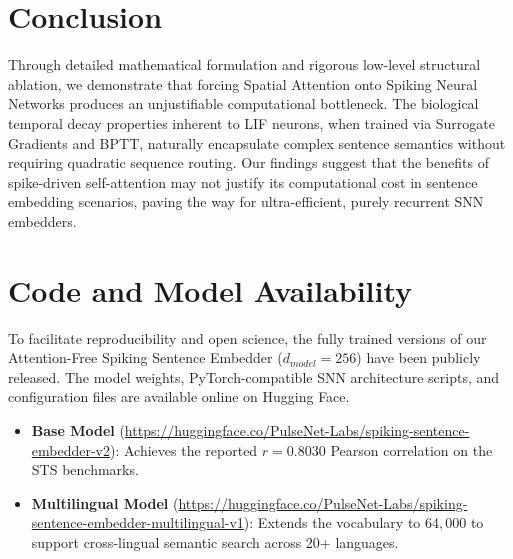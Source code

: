 \documentclass[final]{clv2025}
\begin{document}
\section{Conclusion}
Through detailed mathematical formulation and rigorous low-level structural ablation, we demonstrate that forcing Spatial Attention onto Spiking Neural Networks produces an unjustifiable computational bottleneck. The biological temporal decay properties inherent to LIF neurons, when trained via Surrogate Gradients and BPTT, naturally encapsulate complex sentence semantics without requiring quadratic sequence routing. Our findings suggest that the benefits of spike-driven self-attention may not justify its computational cost in sentence embedding scenarios, paving the way for ultra-efficient, purely recurrent SNN embedders.


\section{Code and Model Availability}
To facilitate reproducibility and open science, the fully trained versions of our Attention-Free Spiking Sentence Embedder ($d_{model} = 256$) have been publicly released. The model weights, PyTorch-compatible SNN architecture scripts, and configuration files are available online on Hugging Face.
\begin{itemize}
    \item \textbf{Base Model} (\url{https://huggingface.co/PulseNet-Labs/spiking-sentence-embedder-v2}): Achieves the reported $r = 0.8030$ Pearson correlation on the STS benchmarks.
    \item \textbf{Multilingual Model} (\url{https://huggingface.co/PulseNet-Labs/spiking-sentence-embedder-multilingual-v1}): Extends the vocabulary to $64,000$ to support cross-lingual semantic search across 20+ languages.
\end{itemize}



\end{document}
